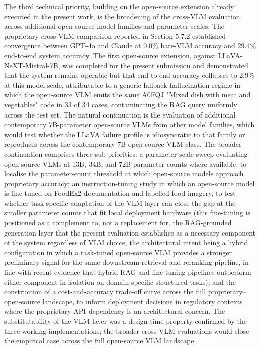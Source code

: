 The third technical priority, building on the open-source extension already executed in the present work, is the broadening of the cross-VLM evaluation across additional open-source model families and parameter scales. The proprietary cross-VLM comparison reported in Section 5.7.2 established convergence between GPT-4o and Claude at 0.0\% bare-VLM accuracy and 29.4\% end-to-end system accuracy. The first open-source extension, against LLaVA-NeXT-Mistral-7B, was completed for the present submission and demonstrated that the system remains operable but that end-to-end accuracy collapses to 2.9\% at this model scale, attributable to a generic-fallback hallucination regime in which the open-source VLM emits the same A0FQJ "Mixed dish with meat and vegetables" code in 33 of 34 cases, contaminating the RAG query uniformly across the test set. The natural continuation is the evaluation of additional contemporary 7B-parameter open-source VLMs from other model families, which would test whether the LLaVA failure profile is idiosyncratic to that family or reproduces across the contemporary 7B open-source VLM class. The broader continuation comprises three sub-priorities: a parameter-scale sweep evaluating open-source VLMs at 13B, 34B, and 72B parameter counts where available, to localise the parameter-count threshold at which open-source models approach proprietary accuracy; an instruction-tuning study in which an open-source model is fine-tuned on FoodEx2 documentation and labelled food imagery, to test whether task-specific adaptation of the VLM layer can close the gap at the smaller parameter counts that fit local deployment hardware (this fine-tuning is positioned as a complement to, not a replacement for, the RAG-grounded generation layer that the present evaluation establishes as a necessary component of the system regardless of VLM choice, the architectural intent being a hybrid configuration in which a task-tuned open-source VLM provides a stronger preliminary signal for the same downstream retrieval and reranking pipeline, in line with recent evidence that hybrid RAG-and-fine-tuning pipelines outperform either component in isolation on domain-specific structured tasks); and the construction of a cost-and-accuracy trade-off curve across the full proprietary--open-source landscape, to inform deployment decisions in regulatory contexts where the proprietary-API dependency is an architectural concern. The substitutability of the VLM layer was a design-time property confirmed by the three working implementations; the broader cross-VLM evaluations would close the empirical case across the full open-source VLM landscape.

